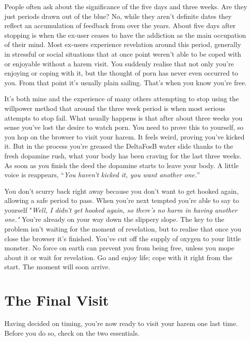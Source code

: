 \documentclass[
]{book}
\begin{document}
People often ask about the significance of the five days and three weeks. Are they just periods drawn out of the blue? No, while they aren't definite dates they reflect an accumulation of feedback from over the years. About five days after stopping is when the ex-user ceases to have the addiction as the main occupation of their mind. Most ex-users experience revelation around this period, generally in stressful or social situations that at once point weren't able to be coped with or enjoyable without a harem visit. You suddenly realise that not only you're enjoying or coping with it, but the thought of porn has never even occurred to you. From that point it's usually plain sailing. That's when you know you're free.

It's both mine and the experience of many others attempting to stop using the willpower method that around the three week period is when most serious attempts to stop fail. What usually happens is that after about three weeks you sense you've lost the desire to watch porn. You need to prove this to yourself, so you hop on the browser to visit your harem. It feels weird, proving you've kicked it. But in the process you're greased the DeltaFosB water slide thanks to the fresh dopamine rush, what your body has been craving for the last three weeks. As soon as you finish the deed the dopamine starts to leave your body. A little voice is reappears, ``\emph{You haven't kicked it, you want another one.}''

You don't scurry back right away because you don't want to get hooked again, allowing a safe period to pass. When you're next tempted you're able to say to yourself "\emph{Well, I didn't get hooked again, so there's no harm in having another one."} You're already on your way down the slippery slope. The key to the problem isn't waiting for the moment of revelation, but to realise that once you close the browser it's finished. You've cut off the supply of oxygen to your little monster. No force on earth can prevent you from being free, unless you mope about it or wait for revelation. Go and enjoy life; cope with it right from the start. The moment will soon arrive.

\hypertarget{the-final-visit}{%
\chapter{The Final Visit}\label{the-final-visit}}

Having decided on timing, you're now ready to visit your harem one last time. Before you do so, check on the two essentials.
\end{document}
